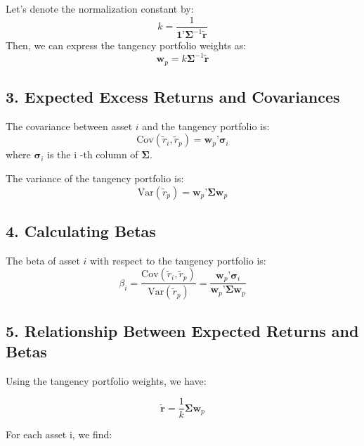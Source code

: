 \documentclass{article}
\begin{document}
Let’s denote the normalization constant by:
\begin{equation}
k = \frac{1}{\mathbf{1}’ \boldsymbol{\Sigma}^{-1} \tilde{\mathbf{r}}}
\end{equation}
Then, we can express the tangency portfolio weights as:
\begin{equation}
\mathbf{w}_p = k \boldsymbol{\Sigma}^{-1} \tilde{\mathbf{r}}
\end{equation}

\subsection*{3. Expected Excess Returns and Covariances}

The covariance between asset $i$ and the tangency portfolio is:
\begin{equation}
\text{Cov}(\tilde{r}_i, \tilde{r}_p) = \mathbf{w}_p’ \boldsymbol{\sigma}_i
\end{equation}
where \( \boldsymbol{\sigma}_i \) is the i -th column of \( \boldsymbol{\Sigma} \).

The variance of the tangency portfolio is:
\begin{equation}
\text{Var}(\tilde{r}_p) = \mathbf{w}_p’ \boldsymbol{\Sigma} \mathbf{w}_p
\end{equation}

\subsection*{4. Calculating Betas}

The beta of asset $i$ with respect to the tangency portfolio is:
\begin{equation}
\beta_i = \frac{\text{Cov}(\tilde{r}_i, \tilde{r}_p)}{\text{Var}(\tilde{r}_p)} = \frac{\mathbf{w}_p’ \boldsymbol{\sigma}_i}{\mathbf{w}_p’ \boldsymbol{\Sigma} \mathbf{w}_p}
\end{equation}

\subsection*{5. Relationship Between Expected Returns and Betas}

Using the tangency portfolio weights, we have:

\begin{equation}
\tilde{\mathbf{r}} = \frac{1}{k} \boldsymbol{\Sigma} \mathbf{w}_p
\end{equation}

For each asset i, we find:
\end{document}
